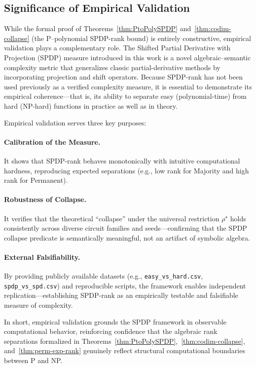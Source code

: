 \documentclass[12pt]{article}
\theoremstyle{definition}
\theoremstyle{definition}
\theoremstyle{remark}
\theoremstyle{remark}
\begin{document}
\subsection{Significance of Empirical Validation}

While the formal proof of Theorems~\ref{thm:PtoPolySPDP} and~\ref{thm:codim-collapse} (the P--polynomial SPDP-rank bound) is entirely constructive, empirical validation plays a complementary role. The Shifted Partial Derivative with Projection (SPDP) measure introduced in this work is a novel algebraic--semantic complexity metric that generalizes classic partial-derivative methods by incorporating projection and shift operators. Because SPDP-rank has not been used previously as a verified complexity measure, it is essential to demonstrate its empirical coherence---that is, its ability to separate easy (polynomial-time) from hard (NP-hard) functions in practice as well as in theory.

Empirical validation serves three key purposes:

\paragraph{Calibration of the Measure.}
It shows that SPDP-rank behaves monotonically with intuitive computational hardness, reproducing expected separations (e.g., low rank for Majority and high rank for Permanent).

\paragraph{Robustness of Collapse.}
It verifies that the theoretical ``collapse'' under the universal restriction $\rho^\star$ holds consistently across diverse circuit families and seeds---confirming that the SPDP collapse predicate is semantically meaningful, not an artifact of symbolic algebra.

\paragraph{External Falsifiability.}
By providing publicly available datasets (e.g., \texttt{easy\_vs\_hard.csv}, \texttt{spdp\_vs\_spd.csv}) and reproducible scripts, the framework enables independent replication---establishing SPDP-rank as an empirically testable and falsifiable measure of complexity.

In short, empirical validation grounds the SPDP framework in observable computational behavior, reinforcing confidence that the algebraic rank separations formalized in Theorems~\ref{thm:PtoPolySPDP},~\ref{thm:codim-collapse}, and~\ref{thm:perm-exp-rank} genuinely reflect structural computational boundaries between P and NP.
\end{document}
